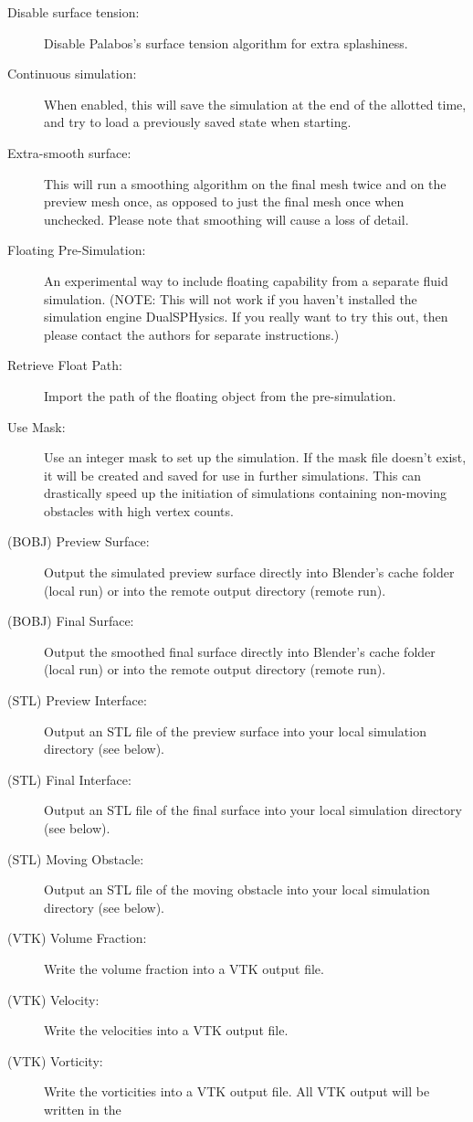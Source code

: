 \documentclass[12pt]{article}
\begin{document}
\begin{description}
\item[Disable surface tension:] Disable Palabos's surface tension algorithm for extra splashiness.
\item[Continuous simulation:] When enabled, this will save the simulation at the end of the allotted time, 
and try to load a previously saved state when starting.
\item[Extra-smooth surface:] This will run a smoothing algorithm on the final mesh twice and on the preview 
mesh once, as opposed to just the final mesh once when unchecked. Please note that smoothing will cause a 
loss of detail.
\item[Floating Pre-Simulation:] An experimental way to include floating capability from a separate fluid 
simulation. (NOTE: This will not work if you haven't installed the simulation engine DualSPHysics. If you 
really want to try this out, then please contact the authors for separate instructions.)
\item[Retrieve Float Path:] Import the path of the floating object from the pre-simulation.
\item[Use Mask:] Use an integer mask to set up the simulation. If the mask file doesn't exist, it will be 
created and saved for use in further simulations. This can drastically speed up the initiation of simulations 
containing non-moving obstacles with high vertex counts.
\item[(BOBJ) Preview Surface:] Output the simulated preview surface directly into Blender's cache folder 
(local run) or into the remote output directory (remote run).
\item[(BOBJ) Final Surface:] Output the smoothed final surface directly into Blender's cache folder (local 
run) or into the remote output directory (remote run).
\item[(STL) Preview Interface:] Output an STL file of the preview surface into your local simulation 
directory (see below).
\item[(STL) Final Interface:] Output an STL file of the final surface into your local simulation directory 
(see below).
\item[(STL) Moving Obstacle:] Output an STL file of the moving obstacle into your local simulation directory 
(see below).
\item[(VTK) Volume Fraction:] Write the volume fraction into a VTK output file.
\item[(VTK) Velocity:] Write the velocities into a VTK output file.
\item[(VTK) Vorticity:] Write the vorticities into a VTK output file. All VTK output will be written in the 

\end{description}
\end{document}
